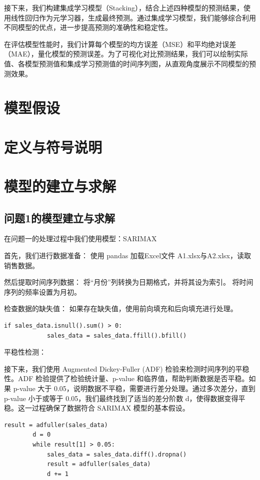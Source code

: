 \documentclass[a4paper]{article}
\begin{document}
接下来，我们构建集成学习模型（Stacking），结合上述四种模型的预测结果，使用线性回归作为元学习器，生成最终预测。通过集成学习模型，我们能够综合利用不同模型的优点，进一步提高预测的准确性和稳定性。

在评估模型性能时，我们计算每个模型的均方误差（MSE）和平均绝对误差（MAE），量化模型的预测误差。为了可视化对比预测结果，我们可以绘制实际值、各模型预测值和集成学习预测值的时间序列图，从直观角度展示不同模型的预测效果。
	\section{模型假设}
	\section{定义与符号说明}
	\section{模型的建立与求解}  
	\subsection{问题1的模型建立与求解}
	在问题一的处理过程中我们使用模型：SARIMAX

	首先，我们进行数据准备：
	使用 pandas 加载Excel文件 A1.xlsx与A2.xlsx，读取销售数据。

	然后提取时间序列数据：
	将“月份”列转换为日期格式，并将其设为索引。
	将时间序列的频率设置为月初。

	检查数据的缺失值：
	如果存在缺失值，使用前向填充和后向填充进行处理。
	\begin{lstlisting}[caption={Python Example}, label={lst:example}]
		if sales_data.isnull().sum() > 0:
    		sales_data = sales_data.ffill().bfill()
	\end{lstlisting}

	平稳性检测：

	接下来，我们使用 Augmented Dickey-Fuller (ADF) 检验来检测时间序列的平稳性。ADF 检验提供了检验统计量、p-value 和临界值，帮助判断数据是否平稳。如果 p-value 大于 0.05，说明数据不平稳，需要进行差分处理。通过多次差分，直到 p-value 小于或等于 0.05，我们最终找到了适当的差分阶数 d，使得数据变得平稳。这一过程确保了数据符合 SARIMAX 模型的基本假设。
	\begin{lstlisting}[caption={Python Example}, label={lst:example}]
		result = adfuller(sales_data)
		d = 0
		while result[1] > 0.05:
			sales_data = sales_data.diff().dropna()
			result = adfuller(sales_data)
			d += 1
	\end{lstlisting}
\end{document}
